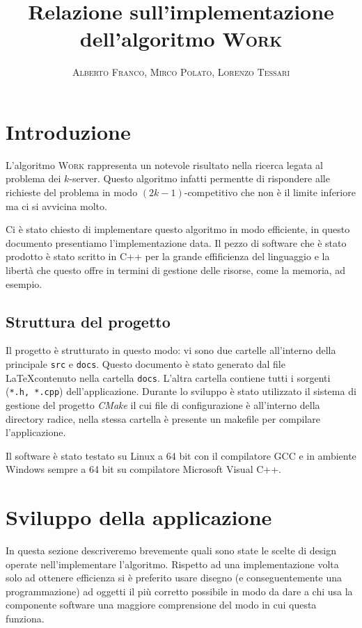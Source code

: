 \documentclass[a4paper, 10pt]{article}
\begin{document}
    \title{Relazione sull'implementazione dell'algoritmo \textsc{Work}}
    \author{\textsc{Alberto Franco, Mirco Polato, Lorenzo Tessari}}
    \maketitle

\section{Introduzione}    
L'algoritmo \textsc{Work} rappresenta un notevole risultato nella ricerca
legata al problema dei $k$-server. Questo algoritmo infatti permentte di 
rispondere alle richieste del problema in modo $(2k - 1)$-competitivo che 
non è il limite inferiore ma ci si avvicina molto. 

Ci è stato chiesto di implementare questo algoritmo in modo efficiente, in 
questo documento presentiamo l'implementazione data. Il pezzo di software che 
è stato prodotto è stato scritto in C++ per la grande effificienza del 
linguaggio e la libertà che questo offre in termini di gestione delle risorse,
come la memoria, ad esempio.

\subsection{Struttura del progetto}
Il progetto è strutturato in questo modo: vi sono due cartelle all'interno della
principale \texttt{src} e \texttt{docs}. Questo documento è stato generato dal 
file \LaTeX contenuto nella cartella \texttt{docs}. L'altra cartella contiene 
tutti i sorgenti (\texttt{*.h, *.cpp}) dell'applicazione. Durante lo sviluppo
è stato utilizzato il sistema di gestione del progetto \emph{CMake} il cui
file di configurazione è all'interno della directory radice, nella stessa
cartella è presente un makefile per compilare l'applicazione. 

Il software è stato testato su Linux a 64 bit con il compilatore GCC e in 
ambiente Windows sempre a 64 bit su compilatore Microsoft Visual C++.

\section{Sviluppo della applicazione}
In questa sezione descriveremo brevemente quali sono state le scelte di design
operate nell'implementare l'algoritmo. Rispetto ad una implementazione volta
solo ad ottenere efficienza si è preferito usare disegno (e conseguentemente
una programmazione) ad oggetti il più corretto possibile in modo da dare 
a chi usa la componente software una maggiore comprensione del modo in cui questa
funziona. 
\end{document}
